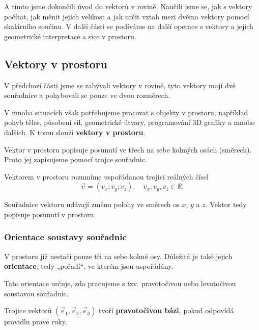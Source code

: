 A tímto jsme dokončili úvod do vektorů v rovině. 
Naučili jsme se, jak s vektory počítat, jak měnit jejich velikost a 
jak určit vztah mezi dvěma vektory pomocí skalárního součinu. 
V další části se podíváme na další operace s vektory a jejich geometrické interpretace a sice v prostoru.




\subsection{Vektory v prostoru}\label{subsec:Vectors_in_space}
V předchozí části jsme se zabývali vektory v rovině, tyto vektory mají dvě souřadnice a pohybovali se pouze ve dvou rozměrech.

V mnoha situacích však potřebujeme pracovat s objekty v prostoru,
například pohyb těles, působení sil, geometrické útvary, programování 3D grafiky a mnoho dalších.
K tomu slouží \textbf{vektory v prostoru}.

Vektor v prostoru popisuje posunutí ve třech na sebe kolmých osách (směrech).
Proto jej zapisujeme pomocí trojce souřadnic.


\begin{definition}\label{def:vector_in_space}
    Vektorem v prostoru rozumíme uspořádanou trojici reálných čísel
    \[
    \vec{v} = (v_x; v_y; v_z), \quad v_x, v_y, v_z \in \mathbb{R}.
    \]
\end{definition}

Souřadnice vektoru udávají změnu polohy ve směrech os $x$, $y$ a $z$.
Vektor tedy popisuje posunutí v prostoru.

\subsubsection{Orientace soustavy souřadnic}\label{subsubsec:Orientation_of_coordinate_system_in_space}

V prostoru již nestačí pouze tři na sebe kolmé osy.
Důležitá je také jejich \textbf{orientace}, tedy „pořadí“, ve kterém jsou uspořádány.

Tato orientace určuje, zda pracujeme s tzv. pravotočivou nebo levotočivou soustavou souřadnic.

\begin{definition}\label{def:right_handed_basis}
    Trojice vektorů $(\vec{e}_1, \vec{e}_2, \vec{e}_3)$ tvoří \textbf{pravotočivou bázi},
    pokud odpovídá pravidlu pravé ruky.
\end{definition}

